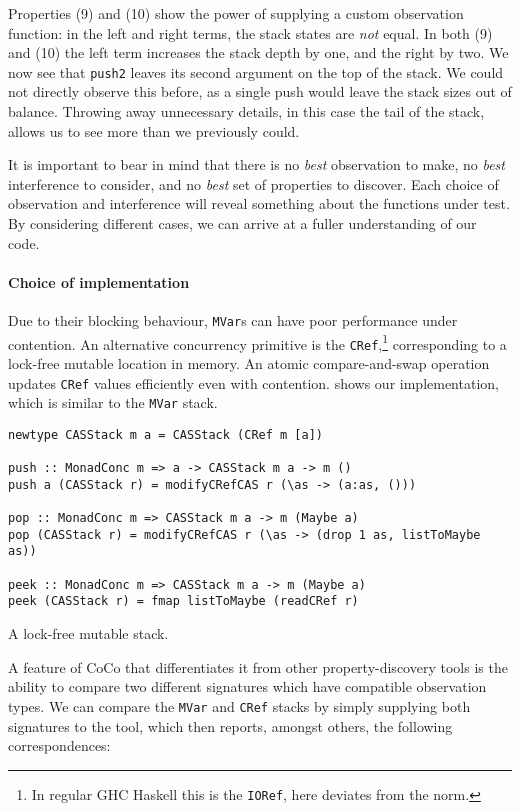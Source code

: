 \noindent
Properties (9) and (10) show the power of supplying a custom
observation function: in the left and right terms, the stack states
are \emph{not} equal.  In both (9) and (10) the left term increases
the stack depth by one, and the right by two.  We now see that
\verb|push2| leaves its second argument on the top of the stack.  We
could not directly observe this before, as a single push would leave
the stack sizes out of balance.  Throwing away unnecessary details, in
this case the tail of the stack, allows us to see more than we
previously could.

It is important to bear in mind that there is no \emph{best}
observation to make, no \emph{best} interference to consider, and no
\emph{best} set of properties to discover.  Each choice of observation
and interference will reveal something about the functions under test.
By considering different cases, we can arrive at a fuller
understanding of our code.

\paragraph{Choice of implementation}
Due to their blocking behaviour, \verb|MVar|s can have poor
performance under contention.  An alternative concurrency primitive is
the \verb|CRef|,\footnote{In regular GHC Haskell this is the
  \texttt{IORef}, here \dejafu{} deviates from the norm.}
corresponding to a lock-free mutable location in memory.  An atomic
compare-and-swap operation updates \verb|CRef| values efficiently even
with contention.   shows our implementation, which
is similar to the \verb|MVar| stack.

\begin{listing}
\begin{verbatim}
newtype CASStack m a = CASStack (CRef m [a])

push :: MonadConc m => a -> CASStack m a -> m ()
push a (CASStack r) = modifyCRefCAS r (\as -> (a:as, ()))

pop :: MonadConc m => CASStack m a -> m (Maybe a)
pop (CASStack r) = modifyCRefCAS r (\as -> (drop 1 as, listToMaybe as))

peek :: MonadConc m => CASStack m a -> m (Maybe a)
peek (CASStack r) = fmap listToMaybe (readCRef r)
\end{verbatim}
\caption{A lock-free mutable stack.}
\label{lst:crefstack}
\end{listing}

A feature of CoCo that differentiates it from other property-discovery
tools is the ability to compare two different signatures which have
compatible observation types.  We can compare the \verb|MVar| and
\verb|CRef| stacks by simply supplying both signatures to the tool,
which then reports, amongst others, the following correspondences:

